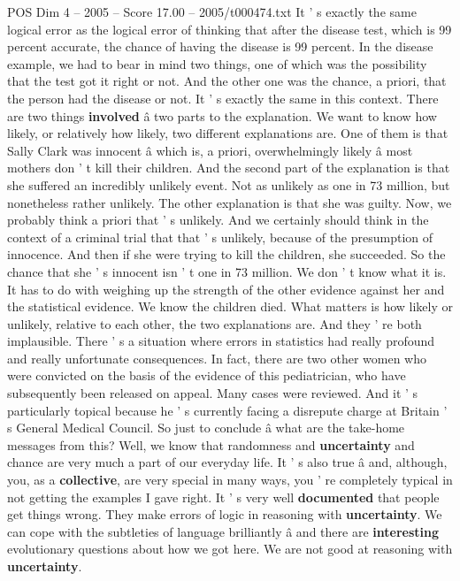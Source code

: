 \begin{textsample}{POS Dim 4 – 2005 – Score 17.00 – 2005/t000474.txt}
It ' s exactly the same logical error as the logical error of thinking that after the disease test, which is 99 percent accurate, the chance of having the disease is 99 percent.
In the disease example, we had to bear in mind two things, one of which was the possibility that the test got it right or not.
And the other one was the chance, a priori, that the person had the disease or not.
It ' s exactly the same in this context.
There are two things \textbf{involved} â two parts to the explanation.
We want to know how likely, or relatively how likely, two different explanations are.
One of them is that Sally Clark was innocent â which is, a priori, overwhelmingly likely â most mothers don ' t kill their children.
And the second part of the explanation is that she suffered an incredibly unlikely event.
Not as unlikely as one in 73 million, but nonetheless rather unlikely.
The other explanation is that she was guilty.
Now, we probably think a priori that ' s unlikely.
And we certainly should think in the context of a criminal trial that that ' s unlikely, because of the presumption of innocence.
And then if she were trying to kill the children, she succeeded.
So the chance that she ' s innocent isn ' t one in 73 million.
We don ' t know what it is.
It has to do with weighing up the strength of the other evidence against her and the statistical evidence.
We know the children died.
What matters is how likely or unlikely, relative to each other, the two explanations are.
And they ' re both implausible.
There ' s a situation where errors in statistics had really profound and really unfortunate consequences.
In fact, there are two other women who were convicted on the basis of the evidence of this pediatrician, who have subsequently been released on appeal.
Many cases were reviewed.
And it ' s particularly topical because he ' s currently facing a disrepute charge at Britain ' s General Medical Council.
So just to conclude â what are the take-home messages from this?
Well, we know that randomness and \textbf{uncertainty} and chance are very much a part of our everyday life.
It ' s also true â and, although, you, as a \textbf{collective}, are very special in many ways, you ' re completely typical in not getting the examples I gave right.
It ' s very well \textbf{documented} that people get things wrong.
They make errors of logic in reasoning with \textbf{uncertainty}.
We can cope with the subtleties of language brilliantly â and there are \textbf{interesting} evolutionary questions about how we got here.
We are not good at reasoning with \textbf{uncertainty}.

\end{textsample}
